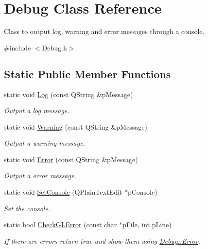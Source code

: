 \hypertarget{class_debug}{\section{Debug Class Reference}
\label{class_debug}
}


Class to output log, warning and error messages through a console.  




{\ttfamily \#include $<$Debug.\+h$>$}

\subsection*{Static Public Member Functions}
\begin{DoxyCompactItemize}
\item 
static void \hyperlink{class_debug_ad287fe45f3f0e9b64fdc71cb1ee12bb9}{Log} (const Q\+String \&p\+Message)
\begin{DoxyCompactList}\small\item\em Output a log message. \end{DoxyCompactList}\item 
static void \hyperlink{class_debug_aa81c5dff65a8fbac6595859c3567fa7b}{Warning} (const Q\+String \&p\+Message)
\begin{DoxyCompactList}\small\item\em Output a warning message. \end{DoxyCompactList}\item 
static void \hyperlink{class_debug_a9f1a9e0e225125cba50c4f842a669d29}{Error} (const Q\+String \&p\+Message)
\begin{DoxyCompactList}\small\item\em Output a error message. \end{DoxyCompactList}\item 
static void \hyperlink{class_debug_aec53e48b6a87042f1016e742667d8101}{Set\+Console} (Q\+Plain\+Text\+Edit $\ast$p\+Console)
\begin{DoxyCompactList}\small\item\em Set the console. \end{DoxyCompactList}\item 
static bool \hyperlink{class_debug_a7fb52458b953734990b15e571e50f41f}{Check\+G\+L\+Error} (const char $\ast$p\+File, int p\+Line)
\begin{DoxyCompactList}\small\item\em If there are errors return true and show them using \hyperlink{class_debug_a9f1a9e0e225125cba50c4f842a669d29}{Debug\+::\+Error}. \end{DoxyCompactList}\end{DoxyCompactItemize}
